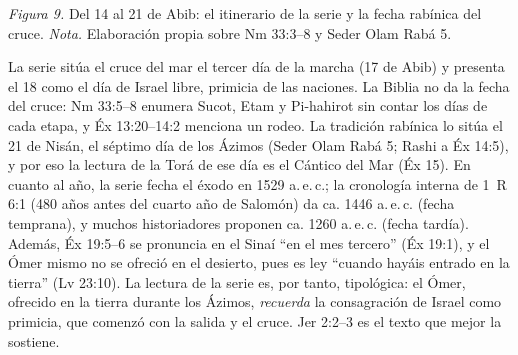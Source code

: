 \documentclass[11pt,letterpaper]{article}
\begin{document}
\begin{center}
\par
{\footnotesize\color{sepia}\textit{Figura 9.} Del 14 al 21 de Abib: el itinerario de la serie y la fecha rabínica del cruce. \textit{Nota.} Elaboración propia sobre Nm 33:3--8 y Seder Olam Rabá 5.}
\end{center}

\begin{nota}
La serie sitúa el cruce del mar el tercer día de la marcha (17 de Abib) y presenta el 18 como el día de Israel libre, primicia de las naciones. La Biblia no da la fecha del cruce: Nm 33:5--8 enumera Sucot, Etam y Pi-hahirot sin contar los días de cada etapa, y Éx 13:20--14:2 menciona un rodeo. La tradición rabínica lo sitúa el 21 de Nisán, el séptimo día de los Ázimos (Seder Olam Rabá 5; Rashi a Éx 14:5), y por eso la lectura de la Torá de ese día es el Cántico del Mar (Éx 15). En cuanto al año, la serie fecha el éxodo en 1529 a.\,e.\,c.; la cronología interna de 1~R 6:1 (480 años antes del cuarto año de Salomón) da ca. 1446 a.\,e.\,c. (fecha temprana), y muchos historiadores proponen ca. 1260 a.\,e.\,c. (fecha tardía). Además, Éx 19:5--6 se pronuncia en el Sinaí ``en el mes tercero'' (Éx 19:1), y el Ómer mismo no se ofreció en el desierto, pues es ley ``cuando hayáis entrado en la tierra'' (Lv 23:10). La lectura de la serie es, por tanto, tipológica: el Ómer, ofrecido en la tierra durante los Ázimos, \emph{recuerda} la consagración de Israel como primicia, que comenzó con la salida y el cruce. Jer 2:2--3 es el texto que mejor la sostiene.
\end{nota}
\end{document}
